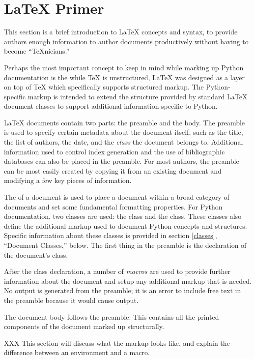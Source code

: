 \documentclass{howto}
\begin{document}
\section{\LaTeX{} Primer \label{latex-primer}}

  This section is a brief introduction to \LaTeX{} concepts and
  syntax, to provide authors enough information to author documents
  productively without having to become ``\TeX{}nicians.''

  Perhaps the most important concept to keep in mind while marking up
  Python documentation is the while \TeX{} is unstructured, \LaTeX{} was
  designed as a layer on top of \TeX{} which specifically supports 
  structured markup.  The Python-specific markup is intended to extend
  the structure provided by standard \LaTeX{} document classes to
  support additional information specific to Python.

  \LaTeX{} documents contain two parts: the preamble and the body.
  The preamble is used to specify certain metadata about the document
  itself, such as the title, the list of authors, the date, and the
  \emph{class} the document belongs to.  Additional information used
  to control index generation and the use of bibliographic databases
  can also be placed in the preamble.  For most authors, the preamble
  can be most easily created by copying it from an existing document
  and modifying a few key pieces of information.

  The  of a document is used to place a document within a
  broad category of documents and set some fundamental formatting
  properties.  For Python documentation, two classes are used: the
   class and the  class.  These classes also
  define the additional markup used to document Python concepts and
  structures.  Specific information about these classes is provided in
  section \ref{classes}, ``Document Classes,'' below.  The first thing
  in the preamble is the declaration of the document's class.

  After the class declaration, a number of \emph{macros} are used to
  provide further information about the document and setup any
  additional markup that is needed.  No output is generated from the
  preamble; it is an error to include free text in the preamble
  because it would cause output.

  The document body follows the preamble.  This contains all the
  printed components of the document marked up structurally.  

  XXX This section will discuss what the markup looks like, and
   explain the difference between an environment and a macro.
\end{document}
